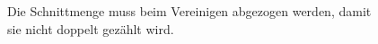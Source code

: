 \documentclass[
  a4paper,
  DIV=11]{scrreprt}
\theoremstyle{definition}
\theoremstyle{remark}
\begin{document}
\begin{figure}

\begin{minipage}[t]{0.50\linewidth}

{\centering 


\caption{\(A \cup B\)}

}

\end{minipage}%
%
\begin{minipage}[t]{0.50\linewidth}

{\centering 


\caption{\(A \cap B\)}

}

\end{minipage}%

\caption{\label{fig-sets2}Die Schnittmenge muss beim Vereinigen
abgezogen werden, damit sie nicht doppelt gezählt wird.}

\end{figure}
\end{document}
